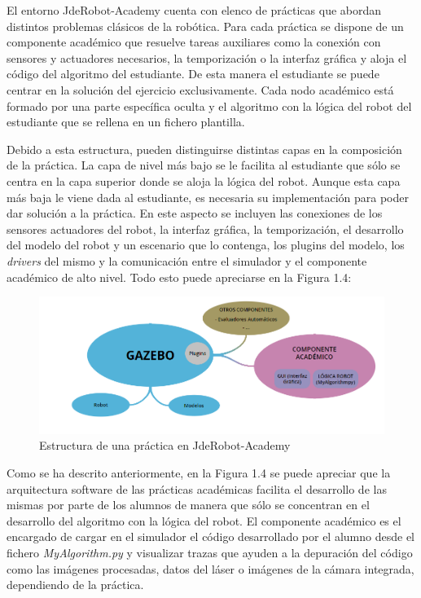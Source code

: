 El entorno JdeRobot-Academy cuenta con elenco de prácticas que abordan distintos problemas clásicos de la robótica. Para cada práctica se dispone de un componente académico que resuelve tareas auxiliares como la conexión con sensores y actuadores necesarios, la temporización o la interfaz gráfica y aloja el código del algoritmo del estudiante. De esta manera el estudiante se puede centrar en la solución del ejercicio exclusivamente. Cada nodo académico está formado por una parte específica oculta y el algoritmo con la lógica del robot del estudiante que se rellena en un fichero plantilla.

Debido a esta estructura, pueden distinguirse distintas capas en la composición de la práctica. La capa de nivel más bajo se le facilita al estudiante que sólo se centra en la capa superior donde se aloja la lógica del robot. Aunque esta capa más baja le viene dada al estudiante, es necesaria su implementación para poder dar solución a la práctica. En este aspecto se incluyen las conexiones de los sensores actuadores del robot, la interfaz gráfica, la temporización, el desarrollo del modelo del robot y un escenario que lo contenga, los plugins del modelo, los \textit{drivers} del mismo y la comunicación entre el simulador y el componente académico de alto nivel. Todo esto puede apreciarse en la Figura 1.4:

\begin{figure}[H]
  \begin{center}
    \includegraphics[width=0.9\linewidth]{figures/estructura_jde.png}
		\caption{Estructura de una práctica en JdeRobot-Academy}
		\label{fig.estructura}
		\end{center}
\end{figure}

Como se ha descrito anteriormente, en la Figura 1.4 se puede apreciar que la arquitectura software de las prácticas académicas facilita el desarrollo de las mismas por parte de los alumnos de manera que sólo se concentran en el desarrollo del algoritmo con la lógica del robot. El componente académico es el encargado de cargar en el simulador el código desarrollado por el alumno desde el fichero \textit{MyAlgorithm.py} y visualizar trazas que ayuden a la depuración del código como las imágenes procesadas, datos del láser o imágenes de la cámara integrada, dependiendo de la práctica.

